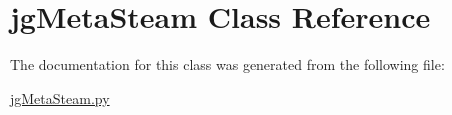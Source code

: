 \hypertarget{classjg_meta_steam}{\section{jg\+Meta\+Steam Class Reference}
\label{classjg_meta_steam}
}


The documentation for this class was generated from the following file\+:\begin{DoxyCompactItemize}
\item 
\hyperlink{jg_meta_steam_8py}{jg\+Meta\+Steam.\+py}\end{DoxyCompactItemize}
